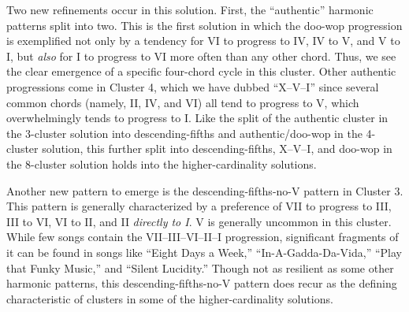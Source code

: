 Two new refinements occur in this solution. First, the ``authentic'' harmonic patterns split into two. This is the first solution in which the doo-wop progression is exemplified not only by a tendency for VI to progress to IV, IV to V, and V to I, but \emph{also} for I to progress to VI more often than any other chord. Thus, we see the clear emergence of a specific four-chord cycle in this cluster. Other authentic progressions come in Cluster 4, which we have dubbed ``X–V–I'' since several common chords (namely, II, IV, and VI) all tend to progress to V, which overwhelmingly tends to progress to I. Like the split of the authentic cluster in the 3-cluster solution into descending-fifths and authentic\slash doo-wop in the 4-cluster solution, this further split into descending-fifths, X–V–I, and doo-wop in the 8-cluster solution holds into the higher-cardinality solutions.

Another new pattern to emerge is the descending-fifths-no-V pattern in Cluster 3. This pattern is generally characterized by a preference of VII to progress to III, III to VI, VI to II, and II \emph{directly to I}. V is generally uncommon in this cluster. While few songs contain the VII–III–VI–II–I progression, significant fragments of it can be found in songs like ``Eight Days a Week,'' ``In-A-Gadda-Da-Vida,'' ``Play that Funky Music,'' and ``Silent Lucidity.'' Though not as resilient as some other harmonic patterns, this descending-fifths-no-V pattern does recur as the defining characteristic of clusters in some of the higher-cardinality solutions.

